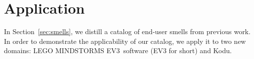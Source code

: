 \documentclass{sig-alternate}
\newcommand{\todo}[1]{\textbf{TODO: #1}}
\newcommand{\ms}{LEGO MINDSTORMS EV3}
\begin{document}





\section{Application}
\label{sec:application}
In Section~\ref{sec:smells}, we distill a catalog of end-user smells from previous work. In order to demonstrate the applicability of our catalog, we apply it to two new domains: \ms~software (EV3 for short) and  Kodu. 
\end{document}
